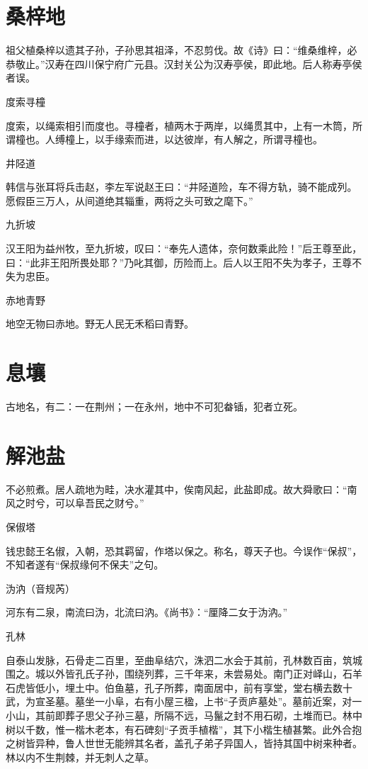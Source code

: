 \documentclass[a4paper,12pt,UTF8,twoside]{ctexbook}
\begin{document}
	\section{桑梓地}
	
	祖父植桑梓以遗其子孙，子孙思其祖泽，不忍剪伐。故《诗》曰：“维桑维梓，必恭敬止。”汉寿在四川保宁府广元县。汉封关公为汉寿亭侯，即此地。后人称寿亭侯者误。
	
	度索寻橦
	
	度索，以绳索相引而度也。寻橦者，植两木于两岸，以绳贯其中，上有一木筒，所谓橦也。人缚橦上，以手缘索而进，以达彼岸，有人解之，所谓寻橦也。
	
	井陉道
	
	韩信与张耳将兵击赵，李左军说赵王曰：“井陉道险，车不得方轨，骑不能成列。愿假臣三万人，从间道绝其辎重，两将之头可致之麾下。”
	
	九折坡
	
	汉王阳为益州牧，至九折坡，叹曰：“奉先人遗体，奈何数乘此险！”后王尊至此，曰：“此非王阳所畏处耶？”乃叱其御，历险而上。后人以王阳不失为孝子，王尊不失为忠臣。
	
	赤地青野
	
	地空无物曰赤地。野无人民无禾稻曰青野。
	
	\section{息壤}
	
	古地名，有二：一在荆州；一在永州，地中不可犯畚锸，犯者立死。
	
	\section{解池盐}
	
	不必煎煮。居人疏地为畦，决水灌其中，俟南风起，此盐即成。故大舜歌曰：“南风之时兮，可以阜吾民之财兮。”
	
	保俶塔
	
	钱忠懿王名俶，入朝，恐其羁留，作塔以保之。称名，尊天子也。今误作“保叔”，不知者遂有“保叔缘何不保夫”之句。
	
	沩汭（音规芮）
	
	河东有二泉，南流曰沩，北流曰汭。《尚书》：“厘降二女于沩汭。”
	
	孔林
	
	自泰山发脉，石骨走二百里，至曲阜结穴，洙泗二水会于其前，孔林数百亩，筑城围之。城以外皆孔氏子孙，围绕列葬，三千年来，未尝易处。南门正对峄山，石羊石虎皆低小，埋土中。伯鱼墓，孔子所葬，南面居中，前有享堂，堂右横去数十武，为宣圣墓。墓坐一小阜，右有小屋三楹，上书“子贡庐墓处”。墓前近案，对一小山，其前即葬子思父子孙三墓，所隔不远，马鬣之封不用石砌，土堆而已。林中树以千数，惟一楷木老本，有石碑刻“子贡手植楷”，其下小楷生植甚繁。此外合抱之树皆异种，鲁人世世无能辨其名者，盖孔子弟子异国人，皆持其国中树来种者。林以内不生荆棘，并无刺人之草。
	
\end{document}
